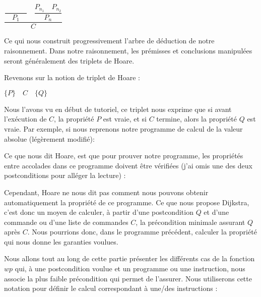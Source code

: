 \begin{center}
$\dfrac{\dfrac{}{\quad P_1\quad} \quad \dfrac{P_{n_1}\quad P_{n_2}}{P_n}}{C}$


\end{center}


Ce qui nous construit progressivement l'arbre de déduction de notre raisonnement.
Dans notre raisonnement, les prémisses et conclusions manipulées seront 
généralement des triplets de Hoare.





Revenons sur la notion de triplet de Hoare :




\begin{center}
$\{ P \}\quad  C\quad \{ Q \}$


\end{center}


Nous l'avons vu en début de tutoriel, ce triplet nous exprime que si avant 
l'exécution de $C$, la propriété $P$ est vraie, et si $C$ termine, alors la
propriété $Q$ est vraie. Par exemple, si nous reprenons notre programme de
calcul de la valeur absolue (légèrement modifié):






Ce que nous dit Hoare, est que pour prouver notre programme, les propriétés
entre accolades dans ce programme doivent être vérifiées (j'ai omis une des
deux postconditions pour alléger la lecture) :






Cependant, Hoare ne nous dit pas comment nous pouvons obtenir automatiquement la 
propriété  de ce programme. Ce que nous propose Dijkstra, c'est donc un moyen
de calculer, à partir d'une postcondition $Q$ et d'une commande ou d'une liste de 
commandes $C$, la précondition minimale assurant $Q$ après $C$. Nous pourrions 
donc, dans le programme précédent, calculer la propriété  qui nous donne les
garanties voulues.



Nous allons tout au long de cette partie présenter les différents cas de la 
fonction $wp$ qui, à une postcondition voulue et un programme ou une instruction,
nous associe la plus faible précondition qui permet de l'assurer. Nous utiliserons
cette notation pour définir le calcul correspondant à une/des instructions :



